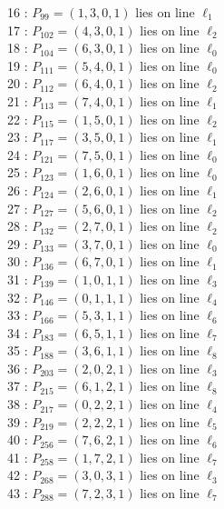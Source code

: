 \documentclass{article}
\begin{document}
{\begin{multicols}{2}
16 : $P_{99}=( 1, 3, 0, 1 )$ lies on line $\ell_{1}$\\
17 : $P_{102}=( 4, 3, 0, 1 )$ lies on line $\ell_{2}$\\
18 : $P_{104}=( 6, 3, 0, 1 )$ lies on line $\ell_{0}$\\
19 : $P_{111}=( 5, 4, 0, 1 )$ lies on line $\ell_{0}$\\
20 : $P_{112}=( 6, 4, 0, 1 )$ lies on line $\ell_{2}$\\
21 : $P_{113}=( 7, 4, 0, 1 )$ lies on line $\ell_{1}$\\
22 : $P_{115}=( 1, 5, 0, 1 )$ lies on line $\ell_{2}$\\
23 : $P_{117}=( 3, 5, 0, 1 )$ lies on line $\ell_{1}$\\
24 : $P_{121}=( 7, 5, 0, 1 )$ lies on line $\ell_{0}$\\
25 : $P_{123}=( 1, 6, 0, 1 )$ lies on line $\ell_{0}$\\
26 : $P_{124}=( 2, 6, 0, 1 )$ lies on line $\ell_{1}$\\
27 : $P_{127}=( 5, 6, 0, 1 )$ lies on line $\ell_{2}$\\
28 : $P_{132}=( 2, 7, 0, 1 )$ lies on line $\ell_{2}$\\
29 : $P_{133}=( 3, 7, 0, 1 )$ lies on line $\ell_{0}$\\
30 : $P_{136}=( 6, 7, 0, 1 )$ lies on line $\ell_{1}$\\
31 : $P_{139}=( 1, 0, 1, 1 )$ lies on line $\ell_{3}$\\
32 : $P_{146}=( 0, 1, 1, 1 )$ lies on line $\ell_{4}$\\
33 : $P_{166}=( 5, 3, 1, 1 )$ lies on line $\ell_{6}$\\
34 : $P_{183}=( 6, 5, 1, 1 )$ lies on line $\ell_{7}$\\
35 : $P_{188}=( 3, 6, 1, 1 )$ lies on line $\ell_{8}$\\
36 : $P_{203}=( 2, 0, 2, 1 )$ lies on line $\ell_{3}$\\
37 : $P_{215}=( 6, 1, 2, 1 )$ lies on line $\ell_{8}$\\
38 : $P_{217}=( 0, 2, 2, 1 )$ lies on line $\ell_{4}$\\
39 : $P_{219}=( 2, 2, 2, 1 )$ lies on line $\ell_{5}$\\
40 : $P_{256}=( 7, 6, 2, 1 )$ lies on line $\ell_{6}$\\
41 : $P_{258}=( 1, 7, 2, 1 )$ lies on line $\ell_{7}$\\
42 : $P_{268}=( 3, 0, 3, 1 )$ lies on line $\ell_{3}$\\
43 : $P_{288}=( 7, 2, 3, 1 )$ lies on line $\ell_{7}$\\

\end{multicols}}
\end{document}
